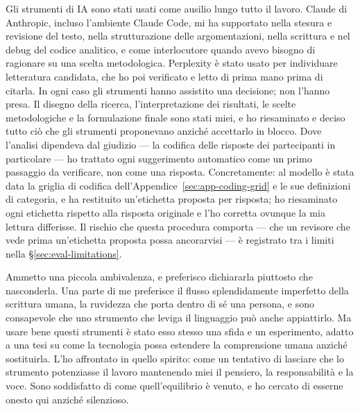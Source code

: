 Gli strumenti di IA sono stati usati come ausilio lungo tutto il lavoro. Claude di Anthropic, incluso l'ambiente Claude Code, mi ha supportato nella stesura e revisione del testo, nella strutturazione delle argomentazioni, nella scrittura e nel debug del codice analitico, e come interlocutore quando avevo bisogno di ragionare su una scelta metodologica. Perplexity è stato usato per individuare letteratura candidata, che ho poi verificato e letto di prima mano prima di citarla. In ogni caso gli strumenti hanno assistito una decisione; non l'hanno presa. Il disegno della ricerca, l'interpretazione dei risultati, le scelte metodologiche e la formulazione finale sono stati miei, e ho riesaminato e deciso tutto ciò che gli strumenti proponevano anziché accettarlo in blocco. Dove l'analisi dipendeva dal giudizio --- la codifica delle risposte dei partecipanti in particolare --- ho trattato ogni suggerimento automatico come un primo passaggio da verificare, non come una risposta. Concretamente: al modello è stata data la griglia di codifica dell'Appendice~\ref{sec:app-coding-grid} e le sue definizioni di categoria, e ha restituito un'etichetta proposta per risposta; ho riesaminato ogni etichetta rispetto alla risposta originale e l'ho corretta ovunque la mia lettura differisse. Il rischio che questa procedura comporta --- che un revisore che vede prima un'etichetta proposta possa ancorarvisi --- è registrato tra i limiti nella \S\ref{sec:eval-limitations}.

Ammetto una piccola ambivalenza, e preferisco dichiararla piuttosto che nasconderla. Una parte di me preferisce il flusso splendidamente imperfetto della scrittura umana, la ruvidezza che porta dentro di sé una persona, e sono consapevole che uno strumento che leviga il linguaggio può anche appiattirlo. Ma usare bene questi strumenti è stato esso stesso una sfida e un esperimento, adatto a una tesi su come la tecnologia possa estendere la comprensione umana anziché sostituirla. L'ho affrontato in quello spirito: come un tentativo di lasciare che lo strumento potenziasse il lavoro mantenendo miei il pensiero, la responsabilità e la voce. Sono soddisfatto di come quell'equilibrio è venuto, e ho cercato di esserne onesto qui anziché silenzioso.
